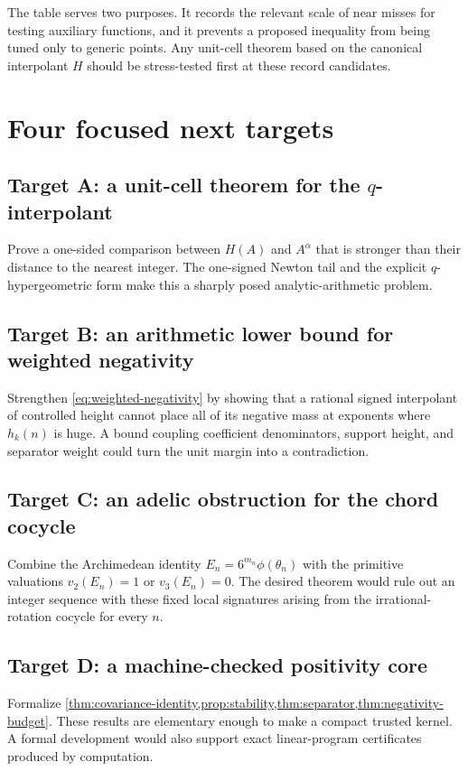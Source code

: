 \documentclass[11pt]{article}
\theoremstyle{definition}
\begin{document}
The table serves two purposes.  It records the relevant scale of near misses for testing auxiliary functions, and it prevents a proposed inequality from being tuned only to generic points.  Any unit-cell theorem based on the canonical interpolant $H$ should be stress-tested first at these record candidates.

\section{Four focused next targets}\label{sec:targets}

\subsection{Target A: a unit-cell theorem for the $q$-interpolant}
Prove a one-sided comparison between $H(A)$ and $A^\alpha$ that is stronger than their distance to the nearest integer.  The one-signed Newton tail and the explicit $q$-hypergeometric form make this a sharply posed analytic-arithmetic problem.

\subsection{Target B: an arithmetic lower bound for weighted negativity}
Strengthen \eqref{eq:weighted-negativity} by showing that a rational signed interpolant of controlled height cannot place all of its negative mass at exponents where $h_k(n)$ is huge.  A bound coupling coefficient denominators, support height, and separator weight could turn the unit margin into a contradiction.

\subsection{Target C: an adelic obstruction for the chord cocycle}
Combine the Archimedean identity $E_n=6^{m_n}\phi(\theta_n)$ with the primitive valuations $v_2(E_n)=1$ or $v_3(E_n)=0$.  The desired theorem would rule out an integer sequence with these fixed local signatures arising from the irrational-rotation cocycle for every $n$.

\subsection{Target D: a machine-checked positivity core}
Formalize \cref{thm:covariance-identity,prop:stability,thm:separator,thm:negativity-budget}.  These results are elementary enough to make a compact trusted kernel.  A formal development would also support exact linear-program certificates produced by computation.
\end{document}
